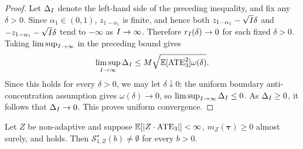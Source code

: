 \begin{proof}
  Let $\Delta_{I}$ denote the left-hand side of the preceding inequality, and fix any $\delta>0$.
  Since $\alpha_1\in(0,1)$, $z_{1-\alpha_1}$ is finite, and hence both $z_{1-\alpha_1}-\sqrt{I}\delta$ and $-z_{1-\alpha_1}-\sqrt{I}\delta$ tend to $-\infty$ as $I\to\infty$.
  Therefore $r_{I}(\delta)\to0$ for each fixed $\delta>0$.
  Taking $\limsup_{I\to\infty}$ in the preceding bound gives
  \[
    \limsup_{I\to\infty}\Delta_{I}
    \le
    M\sqrt{\mathbb{E}[\mathrm{ATE}_3^2]\omega(\delta)} .
  \]
  Since this holds for every $\delta>0$, we may let $\delta\downarrow0$; the uniform boundary anti-concentration assumption gives $\omega(\delta)\to0$, so $\limsup_{I\to\infty}\Delta_{I}\le0$.
  As $\Delta_{I}\ge0$, it follows that $\Delta_{I}\to0$.
  This proves uniform convergence.
\end{proof}

\begin{lemma}
  \label{prop:optimal-solution-exists-weighted-appendix}
  Let $Z$ be non-adaptive and suppose $\mathbb{E}[|Z \cdot \mathrm{ATE}_3|]<\infty$, $m_Z(\bm\tau)\ge0$ almost surely, and  holds.
  Then $\mathcal S_{1,Z}^\star(b)\neq\emptyset$ for every $b>0$.
\end{lemma}

